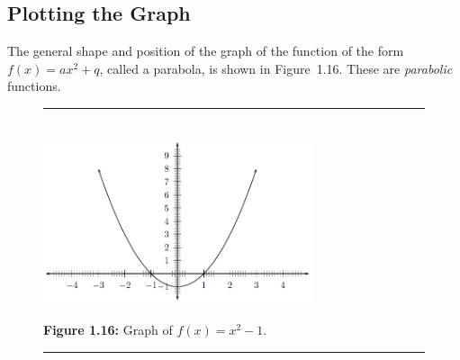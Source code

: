   \subsection{Plotting the Graph}         
        \label{m39345*id240272}The general shape and position of the graph of the function of the form $f\left(x\right)=a{x}^{2}+q$, called a parabola, is shown in Figure~1.16. These are \textsl{parabolic} functions.\par 
    \setcounter{subfigure}{0}
	\begin{figure}[H] %
    \begin{center}
    \rule[.1in]{\figurerulewidth}{.005in} \\
        \label{m39345*uid102!!!underscore!!!media}\label{m39345*uid102!!!underscore!!!printimage}\includegraphics[width=300px]{col11306.imgs/m39345_MG10C11_013.png} %
      \vspace{2pt}
    \vspace{\rubberspace}\par \begin{cnxcaption}
	  \small \textbf{Figure 1.16: }Graph of $f\left(x\right)={x}^{2}-1$.
	\end{cnxcaption}
    \vspace{.1in}
    \rule[.1in]{\figurerulewidth}{.005in} \\
    \end{center}
 \end{figure}       
\label{m39345*secfhsst!!!underscore!!!id1384}
